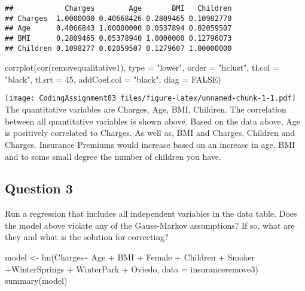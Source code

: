 \documentclass[
]{article}
\newenvironment{Shaded}{\begin{snugshade}}{\end{snugshade}}
\newcommand{\AttributeTok}[1]{\textcolor[rgb]{0.77,0.63,0.00}{#1}}
\newcommand{\ConstantTok}[1]{\textcolor[rgb]{0.00,0.00,0.00}{#1}}
\newcommand{\DecValTok}[1]{\textcolor[rgb]{0.00,0.00,0.81}{#1}}
\newcommand{\FunctionTok}[1]{\textcolor[rgb]{0.00,0.00,0.00}{#1}}
\newcommand{\NormalTok}[1]{#1}
\newcommand{\OtherTok}[1]{\textcolor[rgb]{0.56,0.35,0.01}{#1}}
\newcommand{\SpecialCharTok}[1]{\textcolor[rgb]{0.00,0.00,0.00}{#1}}
\newcommand{\StringTok}[1]{\textcolor[rgb]{0.31,0.60,0.02}{#1}}
\begin{document}
\begin{verbatim}
##            Charges        Age       BMI   Children
## Charges  1.0000000 0.40668426 0.2809465 0.10982770
## Age      0.4066843 1.00000000 0.0537894 0.02059507
## BMI      0.2809465 0.05378940 1.0000000 0.12796073
## Children 0.1098277 0.02059507 0.1279607 1.00000000
\end{verbatim}

\begin{Shaded}
\begin{Highlighting}[]
\FunctionTok{corrplot}\NormalTok{(}\FunctionTok{cor}\NormalTok{(removequalitative1),}
\AttributeTok{type =} \StringTok{"lower"}\NormalTok{,}
\AttributeTok{order =} \StringTok{"hclust"}\NormalTok{,}
\AttributeTok{tl.col =} \StringTok{"black"}\NormalTok{,}
\AttributeTok{tl.srt =} \DecValTok{45}\NormalTok{,}
\AttributeTok{addCoef.col =} \StringTok{"black"}\NormalTok{,}
\AttributeTok{diag =} \ConstantTok{FALSE}\NormalTok{)}
\end{Highlighting}
\end{Shaded}

\texttt{[image: CodingAssignment03\_files/figure-latex/unnamed-chunk-1-1.pdf]}
The quantitative variables are Charges, Age, BMI, Children. The
correlation between all quantitative variables is shown above. Based on
the data above, Age is positively correlated to Charges. As well as, BMI
and Charges, Children and Charges. Insurance Premiums would increase
based on an increase in age, BMI and to some small degree the number of
children you have.

\hypertarget{question-3}{%
\subsection{Question 3}\label{question-3}}

Run a regression that includes all independent variables in the data
table. Does the model above violate any of the Gauss-Markov assumptions?
If so, what are they and what is the solution for correcting?

\begin{Shaded}
\begin{Highlighting}[]
\NormalTok{model }\OtherTok{\textless{}{-}} \FunctionTok{lm}\NormalTok{(Charges}\SpecialCharTok{\textasciitilde{}}\NormalTok{ Age }\SpecialCharTok{+}\NormalTok{ BMI }\SpecialCharTok{+}\NormalTok{ Female }\SpecialCharTok{+}\NormalTok{ Children }\SpecialCharTok{+}\NormalTok{ Smoker }\SpecialCharTok{+}\NormalTok{WinterSprings }\SpecialCharTok{+}\NormalTok{ WinterPark }\SpecialCharTok{+}\NormalTok{ Oviedo, }\AttributeTok{data =}\NormalTok{ insuranceremove3)}
\FunctionTok{summary}\NormalTok{(model)}
\end{Highlighting}
\end{Shaded}
\end{document}
